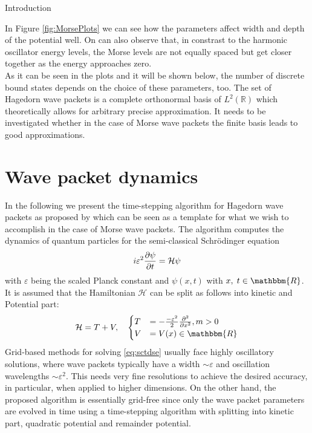 \begin{chapter}{Introduction}
\begin{figure}[h!]
\end{figure}

In Figure \ref{fig:MorsePlots} we can see how the parameters affect width and depth of the potential well. On can also observe
that, in constrast to the harmonic oscillator energy levels, the Morse levels are not equally spaced but get closer together as the energy
approaches zero.\\

As it can be seen in the plots and it will be shown below, the number of discrete bound states
depends on the choice of these parameters, too.
The set of Hagedorn wave packets is a complete orthonormal basis of $L^2(\mathbb{R})$ which theoretically allows for
arbitrary precise approximation. It needs to be investigated whether in the case of Morse wave packets the finite basis leads to good approximations.\\



\section{Wave packet dynamics} %
\label{sec:Wave packet dynamics}
In the following we present the time-stepping algorithm for Hagedorn wave packets as proposed by \cite{FGL_semiclassical_dynamics} which can be seen as a template for what we
wish to accomplish in the case of Morse wave packets. The algorithm computes the dynamics of quantum particles for the semi-classical Schrödinger
equation
\begin{equation}
    \label{eq:sctdse}
    i\varepsilon^2\frac{\partial \psi}{\partial t}=\mathcal{H}\psi
\end{equation}
with $\varepsilon$ being the scaled Planck constant and  $\psi(x,t)$ with $x,\;t\in\mathbbm{R}$.\\
It is assumed that the Hamiltonian $\mathcal{H}$ can be split as follows into kinetic and Potential part:
\begin{equation}
	\mathcal{H}=T+V,\quad\begin{cases}
	    T&=-\frac{-\varepsilon^2}{2}\pdiff{^2}{x^2}, m>0\\
	    V&=V(x)\in\mathbbm{R}	
	\end{cases}
\end{equation}
Grid-based methods for solving \eqref{eq:sctdse} usually face highly oscillatory solutions, where wave packets typically have a width
$\sim\varepsilon$ and oscillation wavelengths $\sim \varepsilon^2$. This needs very fine resolutions to achieve the desired accuracy, in particular,
when applied to higher dimensions. On the other hand, the proposed algorithm is essentially grid-free since only the wave packet parameters are evolved
in time using a time-stepping algorithm with splitting into kinetic part, quadratic potential and remainder potential.


\end{chapter}
